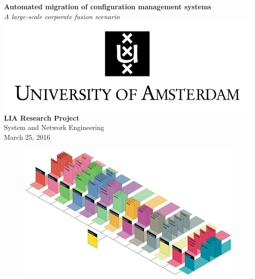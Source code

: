 \documentclass[a4paper, 11pt]{article}
\author{%
	\vspace{.30cm}
    \textbf{Bram ter Borch} \\
    \texttt{\footnotesize bram.terborch@os3.nl}\vspace{35pt}
    \textbf{Siem Hermans} \\
    \texttt{\footnotesize siem.hermans@os3.nl}
    }
\begin{document}
\begin{titlepage}
\begin{center}
  \textbf{\huge Automated migration of configuration management systems \\}
  \vspace{.3cm}
  \Large \textit{A large-scale corporate fusion scenario}
  \\
  \vspace{.5cm}
  \includegraphics[scale=1.2]{img/UvA-logo-english.jpg}
  \\
  \vspace{.5cm}
  \normalsize \textbf{LIA Research Project}
  \\
  \normalsize System and Network Engineering
  \\
  \vspace{.3cm}
  \normalsize {March 25, 2016}
  \vspace{.2cm}
\end{center}

\begin{figure}[!hb]
  \begin{center}
  	\includegraphics[scale=0.55]{img/cover.jpg}
  \end{center}
\end{figure}


\end{titlepage}
\end{document}
